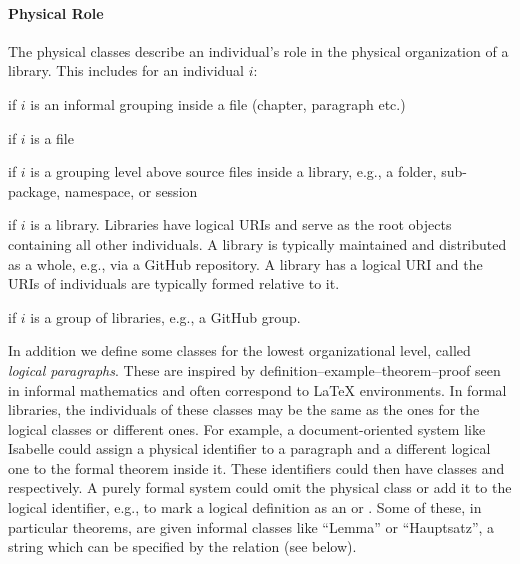 \paragraph{Physical Role}
The physical classes describe an individual's role in the physical organization of a library.
This includes for an individual $i$:
\begin{compactitem}
 \item {} if $i$ is an informal grouping inside a file (chapter, paragraph etc.)
 \item {} if $i$ is a file
 \item {} if $i$ is a grouping level above source files inside a library, e.g., a folder, sub-package, namespace, or session
 \item {} if $i$ is a library. Libraries have logical URIs and serve as the root objects containing all other individuals.
 A library is typically maintained and distributed as a whole, e.g., via a GitHub repository.
 A library has a logical URI and the URIs of individuals are typically formed relative to it.
 \item {} if $i$ is a group of libraries, e.g., a GitHub group.
\end{compactitem}

\noindent In addition we define some classes for the lowest organizational level, called \emph{logical paragraphs}.
These are inspired by definition--example--theorem--proof seen in informal mathematics and often correspond to {\LaTeX} environments.
In formal libraries, the individuals of these classes may be the same as the ones for the logical classes or different ones.
For example, a document-oriented system like Isabelle could assign a physical identifier to a paragraph and a different logical one to the formal theorem inside it.
These identifiers could then have classes  and \truthObject respectively. %
A purely formal system could omit the physical class or add it to the logical identifier, e.g., to mark a logical definition as an  or .
Some of these, in particular theorems, are given informal classes like ``Lemma'' or ``Hauptsatz'', a string which can be specified by the  relation (see below).
 

